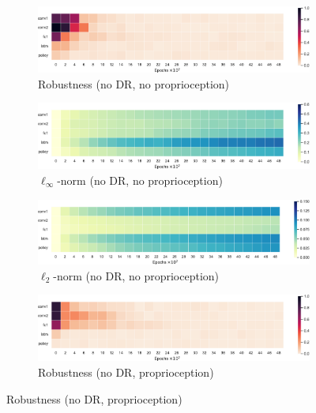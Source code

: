 \begin{figure}[h!]
  \centering
  \begin{subfigure}{0.32\textwidth}
    \includegraphics[width=\textwidth]{figures/chapter6/robustness/jaco/visual_std/error}
    \caption{Robustness (no DR, no proprioception)}
  \end{subfigure}
  \begin{subfigure}{0.32\textwidth}
    \includegraphics[width=\textwidth]{figures/chapter6/robustness/jaco/visual_std/inf_dist}
    \caption{$\ell_\infty$-norm (no DR, no proprioception)}
  \end{subfigure}
  \begin{subfigure}{0.32\textwidth}
    \includegraphics[width=\textwidth]{figures/chapter6/robustness/jaco/visual_std/l2_dist}
    \caption{$\ell_2$-norm (no DR, no proprioception)}
  \end{subfigure}
  \begin{subfigure}{0.32\textwidth}
    \includegraphics[width=\textwidth]{figures/chapter6/robustness/jaco/sensor_std/error}
    \caption{Robustness (no DR, proprioception)}

\end{subfigure}
\end{figure}
